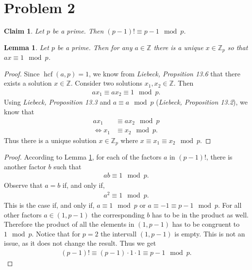 \documentclass{article}
\newcommand{\Z}{\mathbb{Z}}
\newtheorem{claim}[section]{Claim}
\newtheorem{lemma}{Lemma}[section]
\DeclareMathOperator{\hcf}{hcf}
\begin{document}
\section*{Problem 2}
\begin{claim}
  Let $p$ be a prime. Then $(p-1)!\equiv p-1 \mod p$.
\end{claim}
\begin{adjustwidth}{2em}{2em}
  \begin{lemma}
    \label{l1}
    Let $p$ be a prime. Then for any $a\in\Z$ there is a unique $x\in\Z_p$ so that $ax\equiv 1 \mod p$.
  \end{lemma}
  \begin{proof}
    Since $\hcf(a,p)=1$, we know from \emph{Liebeck, Propsition 13.6} that there exists a solution $x\in\Z$.
    Consider two solutions $x_1, x_2\in \Z$. Then
    \begin{align*}
      ax_1 \equiv ax_2 \equiv 1 \mod p.  
    \end{align*}
    Using \emph{Liebeck, Proposition 13.3} and $a\equiv a \mod p$ (\emph{Liebeck, Proposition 13.2}), we know that
    \begin{align*}
      ax_1&\equiv ax_2 \mod p\\
      \Leftrightarrow x_1&\equiv x_2 \mod p.
    \end{align*}
    Thus there is a unique solution $x\in\Z_p$ where $x\equiv x_1\equiv x_2 \mod p$.
  \end{proof}
\end{adjustwidth}
\begin{proof}
  According to Lemma \ref{l1}, for each of the factors $a$ in $(p-1)!$, there is another factor $b$ such that
  \begin{align*}
    ab\equiv 1 \mod p.
  \end{align*}
  Observe that $a=b$ if, and only if,
  \begin{align*}
    a^2 \equiv 1 \mod p.
  \end{align*}
  This is the case if, and only if, $a\equiv 1 \mod p$ or $a\equiv -1 \equiv p-1 \mod p$. 
  For all other factors $a\in(1,p-1)$ the corresponding $b$ has to be in the product as well.
  Therefore the product of all the elements in $(1,p-1)$ has to be congruent to $1\mod p$.
  Notice that for $p=2$ the intervall $(1,p-1)$ is empty. 
  This is not an issue, as it does not change the result.
  Thus we get
  \begin{align*}
    (p-1)!\equiv (p-1)\cdot 1\cdot 1 \equiv p-1 \mod p.
  \end{align*}
\end{proof}
\end{document}
